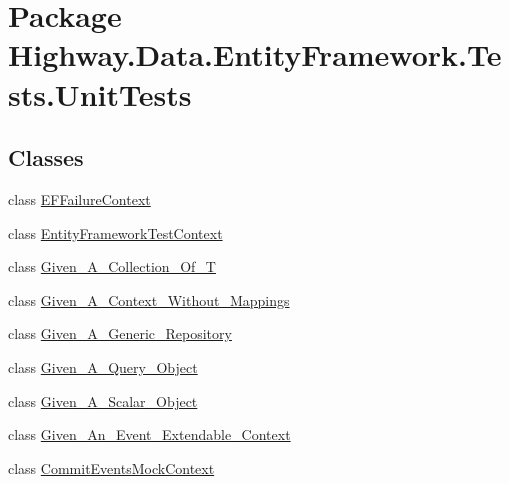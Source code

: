 \hypertarget{namespace_highway_1_1_data_1_1_entity_framework_1_1_tests_1_1_unit_tests}{\section{Package Highway.\-Data.\-Entity\-Framework.\-Tests.\-Unit\-Tests}
\label{namespace_highway_1_1_data_1_1_entity_framework_1_1_tests_1_1_unit_tests}
}
\subsection*{Classes}
\begin{DoxyCompactItemize}
\item 
class \hyperlink{class_highway_1_1_data_1_1_entity_framework_1_1_tests_1_1_unit_tests_1_1_e_f_failure_context}{E\-F\-Failure\-Context}
\item 
class \hyperlink{class_highway_1_1_data_1_1_entity_framework_1_1_tests_1_1_unit_tests_1_1_entity_framework_test_context}{Entity\-Framework\-Test\-Context}
\item 
class \hyperlink{class_highway_1_1_data_1_1_entity_framework_1_1_tests_1_1_unit_tests_1_1_given___a___collection___of___t}{Given\-\_\-\-A\-\_\-\-Collection\-\_\-\-Of\-\_\-\-T}
\item 
class \hyperlink{class_highway_1_1_data_1_1_entity_framework_1_1_tests_1_1_unit_tests_1_1_given___a___context___without___mappings}{Given\-\_\-\-A\-\_\-\-Context\-\_\-\-Without\-\_\-\-Mappings}
\item 
class \hyperlink{class_highway_1_1_data_1_1_entity_framework_1_1_tests_1_1_unit_tests_1_1_given___a___generic___repository}{Given\-\_\-\-A\-\_\-\-Generic\-\_\-\-Repository}
\item 
class \hyperlink{class_highway_1_1_data_1_1_entity_framework_1_1_tests_1_1_unit_tests_1_1_given___a___query___object}{Given\-\_\-\-A\-\_\-\-Query\-\_\-\-Object}
\item 
class \hyperlink{class_highway_1_1_data_1_1_entity_framework_1_1_tests_1_1_unit_tests_1_1_given___a___scalar___object}{Given\-\_\-\-A\-\_\-\-Scalar\-\_\-\-Object}
\item 
class \hyperlink{class_highway_1_1_data_1_1_entity_framework_1_1_tests_1_1_unit_tests_1_1_given___an___event___extendable___context}{Given\-\_\-\-An\-\_\-\-Event\-\_\-\-Extendable\-\_\-\-Context}
\item 
class \hyperlink{class_highway_1_1_data_1_1_entity_framework_1_1_tests_1_1_unit_tests_1_1_commit_events_mock_context}{Commit\-Events\-Mock\-Context}
\end{DoxyCompactItemize}
